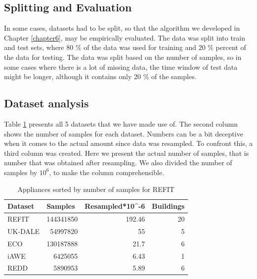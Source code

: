 \subsection{Splitting and Evaluation} \label{ssec:ds_eval}

In some cases, datasets had to be split, so that the algorithm we developed in Chapter \ref{chapter6}, may be empirically evaluated. 
The data was split into train and test sets, where 80 \% of the data was used for training and 20 \% percent of the data for testing.
The data was split based on the number of samples, so in some cases where there is a lot of missing data, the time window of test data might be longer, although it contains only 20 \% of the samples.

\subsection{Dataset analysis}
Table \ref{tab:dataset_analysis} presents all 5 datasets that we have made use of.
The second column shows the number of samples for each dataset.
Numbers can be a bit deceptive when it comes to the actual amount since data was resampled.
To confront this, a third column was created.
Here we present the actual number of samples,
that is number that was obtained after resampling.
We also divided the number of samples by $10^6$, to make the column comprehensible.

\begin{table}[H]
    \centering
    \begin{tabular}{|l|r|r|r|}
    \hline
    \textbf{Dataset} & \multicolumn{1}{l|}{\textbf{Samples}} & \multicolumn{1}{l|}{\textbf{Resampled*10\textasciicircum{}-6}} & \multicolumn{1}{l|}{\textbf{Buildings}} \\ \hline
    REFIT            & 144341850                             & 192.46                                                         & 20                                      \\ \hline
    UK-DALE          & 54997820                              & 55                                                             & 5                                       \\ \hline
    ECO              & 130187888                             & 21.7                                                           & 6                                       \\ \hline
    iAWE             & 6425055                               & 6.43                                                           & 1                                       \\ \hline
    REDD             & 5890953                               & 5.89                                                           & 6                                       \\ \hline
    \end{tabular}
    \caption{Appliances sorted by number of samples for REFIT}
    \label{tab:dataset_analysis}
\end{table}

